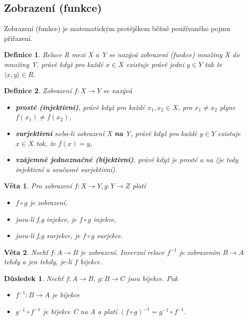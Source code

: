 \documentclass[12pt,a4paper]{article}
\newtheorem{definition}{Definice}
\newtheorem{sentence}{Věta}
\newtheorem{result}{Důsledek}
\begin{document}
\subsection{Zobrazení (funkce)}
Zobrazení (funkce) je matematickým protějškem běžně používaného pojmu přiřazení.

\begin{definition}
	Relace R mezi X a Y se nazývá zobrazení (funkce) množiny X do množiny Y, právě když pro každé $x \in X$ existuje právě jedni $y \in Y$ tak že $\langle x, y \rangle \in R$.
\end{definition}

\begin{definition}
	Zobrazení $f : X \rightarrow Y$ se nazývá
	\begin{itemize}
		\item[a)] \textbf{prosté (injektivní)}, právě když pro každé $x_1,x_2 \in X$, pro $x_1 \not= x_2$ plyne $f(x_1) \not= f(x_2)$,
		\item[b)] \textbf{surjektivní} nebo-li zobrazení X \textbf{na} Y, právě když pro každé $y \in Y$ existuje $x \in X$ tak, že  $f(x) = y$,
		\item[c)] \textbf{vzájemně jednoznačné (bijektivní)}, právě když je prosté a na (je tedy injektivní a současně surjektivní).
	\end{itemize}
\end{definition}

\begin{sentence}
	Pro zobrazení $f : X \rightarrow Y, g : Y \rightarrow Z$ platí
	\begin{itemize}
		\item[a)] $f \circ g$ je zobrazení,
		\item[b)] jsou-li f,g injekce, je $f \circ g$ injekce,
		\item[c)] jsou-li f,g surjekce, je $f \circ g$ surjekce.
	\end{itemize}
\end{sentence}

\begin{sentence}
	Nechť $f: A \rightarrow B$ je zobrazení. Inverzní relace $f^{-1}$ je zobrazením $B \rightarrow A$ tehdy a jen tehdy, je-li $f$ bijekce.
\end{sentence}

\begin{result}
	Nechť $f: A \rightarrow B, \ g: B \rightarrow C$ jsou bijekce. Pak
	\begin{itemize}
		\item[a)] $f^{-1} : B \rightarrow A$ je bijekce
		\item[b)] $g^{-1} \circ f^{-1}$ je bijekce C na A a platí $(f \circ g)^{-1} = g^{-1} \circ f^{-1}$.
	\end{itemize}
\end{result}
\end{document}

